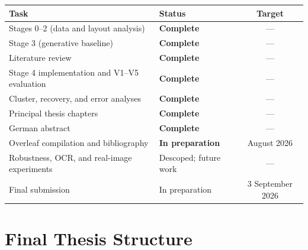 \documentclass[11pt,a4paper]{article}
\begin{document}
\begin{center}
\begin{tabular}{llc}
\toprule
\textbf{Task} & \textbf{Status} & \textbf{Target} \\
\midrule
Stages 0--2 (data and layout analysis)       & \textcolor{completed}{\textbf{Complete}} & --- \\
Stage 3 (generative baseline)                & \textcolor{completed}{\textbf{Complete}} & --- \\
Literature review                            & \textcolor{completed}{\textbf{Complete}} & --- \\
Stage 4 implementation and V1--V5 evaluation & \textcolor{completed}{\textbf{Complete}} & --- \\
Cluster, recovery, and error analyses        & \textcolor{completed}{\textbf{Complete}} & --- \\
Principal thesis chapters                    & \textcolor{completed}{\textbf{Complete}} & --- \\
German abstract                              & \textcolor{completed}{\textbf{Complete}} & --- \\
Overleaf compilation and bibliography        & \textcolor{inprogress}{\textbf{In preparation}} & August 2026 \\
Robustness, OCR, and real-image experiments  & Descoped; future work & --- \\
Final submission                             & In preparation & 3 September 2026 \\
\bottomrule
\end{tabular}
\end{center}

\section{Final Thesis Structure}
\label{sec:structure}
\end{document}
